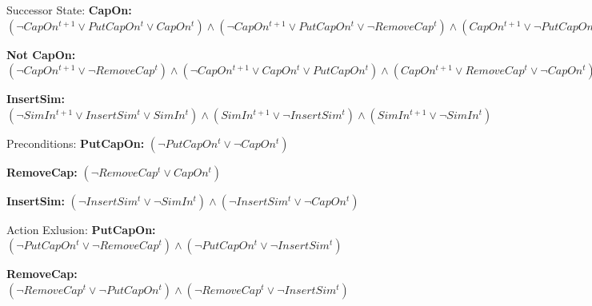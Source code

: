\documentclass[11pt]{article}
\begin{document}
\noindent Successor State:\newline
\noindent \textbf{CapOn:}\newline
$
(\neg CapOn^{t+1} \vee PutCapOn^{t} \vee CapOn^{t}) \wedge (\neg CapOn^{t+1} \vee PutCapOn^{t} \vee \neg RemoveCap^{t}) \wedge (CapOn^{t+1} \vee \neg PutCapOn^{t}) \wedge (CapOn^{t+1} \vee \neg CapOn^{t} \vee RemoveCap^{t})
$\newline

\noindent \textbf{Not CapOn:}\newline
$
(\neg CapOn^{t+1} \vee \neg RemoveCap^{t}) \wedge (\neg CapOn^{t+1} \vee CapOn^{t} \vee PutCapOn^{t}) \wedge (CapOn^{t+1} \vee RemoveCap^{t} \vee \neg CapOn^{t}) \wedge (CapOn^{t+1} \vee RemoveCap^{t} \vee \neg PutCapOn^{t})
$\newline

\noindent \textbf{InsertSim:}\newline
$
(\neg SimIn^{t+1} \vee InsertSim^{t} \vee SimIn^{t}) \wedge (SimIn^{t+1} \vee \neg InsertSim^{t}) \wedge (SimIn^{t+1} \vee \neg SimIn^{t})
$\newline

\noindent Preconditions:\newline
\noindent \textbf{PutCapOn:}\newline
$
(\neg PutCapOn^{t} \vee \neg CapOn^{t})
$\newline

\noindent \textbf{RemoveCap:}\newline
$
(\neg RemoveCap^{t} \vee CapOn^{t})
$\newline

\noindent \textbf{InsertSim:}\newline
$
(\neg InsertSim^{t} \vee \neg SimIn^{t}) \wedge (\neg InsertSim^{t} \vee \neg CapOn^{t})
$\newline

\noindent Action Exlusion:\newline
\noindent \textbf{PutCapOn:}\newline
$
(\neg PutCapOn^{t} \vee \neg RemoveCap^{t}) \wedge (\neg PutCapOn^{t} \vee \neg InsertSim^{t})
$\newline

\noindent \textbf{RemoveCap:}\newline
$
(\neg RemoveCap^{t} \vee \neg PutCapOn^{t}) \wedge (\neg RemoveCap^{t} \vee \neg InsertSim^{t})
$\newline
\end{document}
